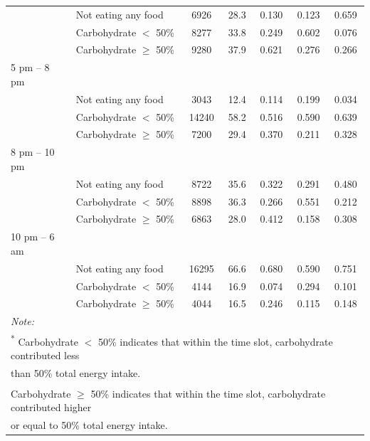 \begin{table}[H]
\begin{tabular}[t]{llccccc}
		& Not eating any food & 6926 & 28.3 & 0.130 & 0.123 & 0.659\\
		& Carbohydrate $<$ 50\% & 8277 & 33.8 & 0.249 & 0.602 & 0.076\\
		& Carbohydrate $\geqslant$ 50\% & 9280 & 37.9 & 0.621 & 0.276 & 0.266\\
		5 pm – 8 pm &  &  &  &  &  & \\
		& Not eating any food & 3043 & 12.4 & 0.114 & 0.199 & 0.034\\
		& Carbohydrate $<$ 50\% & 14240 & 58.2 & 0.516 & 0.590 & 0.639\\
		& Carbohydrate $\geqslant$ 50\% & 7200 & 29.4 & 0.370 & 0.211 & 0.328\\
		8 pm – 10 pm &  &  &  &  &  & \\
		& Not eating any food & 8722 & 35.6 & 0.322 & 0.291 & 0.480\\
		& Carbohydrate $<$ 50\% & 8898 & 36.3 & 0.266 & 0.551 & 0.212\\
		& Carbohydrate $\geqslant$ 50\% & 6863 & 28.0 & 0.412 & 0.158 & 0.308\\
		10 pm – 6 am &  &  &  &  &  & \\
		& Not eating any food & 16295 & 66.6 & 0.680 & 0.590 & 0.751\\
		& Carbohydrate $<$ 50\% & 4144 & 16.9 & 0.074 & 0.294 & 0.101\\
		& Carbohydrate $\geqslant$ 50\% & 4044 & 16.5 & 0.246 & 0.115 & 0.148\\
		\bottomrule
		\multicolumn{7}{l}{\textit{Note: }}\\
		\multicolumn{7}{l}{\textsuperscript{*} Carbohydrate $<$ 50\% indicates that within the time slot, carbohydrate contributed less }\\
		\multicolumn{7}{l}{than 50\% total energy intake.}\\ 
		\multicolumn{7}{l}{\textsuperscript{\dag} Carbohydrate $\geqslant$ 50\% indicates that within the time slot, carbohydrate contributed higher }\\
		\multicolumn{7}{l}{or equal to 50\% total energy intake.}\\ 
	\end{tabular}
\end{table}

\vspace{-0.3cm}

